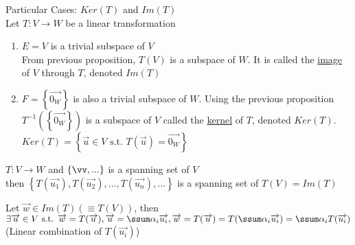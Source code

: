 \documentclass[12pt]{article}
\renewcommand{\v}[1]{\overrightarrow{#1}}
\newenvironment{proof}{\block[Proof]}{\endblock}
\newenvironment{remark}{\block[Remark]}{\endblock}
\newcommand{\st}[0]{\text{ s.t. }}
\newcommand{\bb}[1]{\left\{#1\right\}}
\newcommand{\pp}[1]{\left(#1\right)}
\begin{document}
Particular Cases: $Ker(T)$ and $Im(T)$ \\
Let $T: V \rightarrow W$ be a linear transformation \\
\begin{enumerate}
	\item $E = V$ is a trivial subspace of $V$ \\
	From previous proposition, $T(V)$ is a subspace of $W$. It is called the \underline{image} of $V$ through $T$, denoted $Im(T)$ 
	
	\item $F = \bb{\v{0_W}}$ is also a trivial subspace of $W$. Using the previous proposition $T^{-1}\pp{\bb{\v{0_W}}}$ is a subspace of $V$ called the \underline{kernel} of $T$, denoted $Ker(T)$. \\
	$Ker(T) = \bb{\v{u} \in V \st T(\v{u}) = \v{0_W}}$
\end{enumerate}

\begin{remark}
	$T: V \rightarrow W$ and $\bb{\vv, ...}$ is a spanning set of $V$ \\
	then $\bb{T(\v{u_1}), T(\v{u_2}), ..., T(\v{u_n}), ...}$ is a spanning set of $T(V) = Im(T)$
	
	\begin{proof}
		Let $\v{w} \in Im(T) \pp{\equiv T(V)}$, then $\exists \v{u} \in V \st \v{w} = T(\v{u}), \v{u} = \ssum \alpha_i \v{u_i}, \v{w} = T(\v{u}) = T(\ssum \alpha_i \v{u_i}) = \ssum \alpha_i T(\v{u_i})$ (Linear combination of $T(\v{u_i})$)
	\end{proof}
\end{remark}
\end{document}
